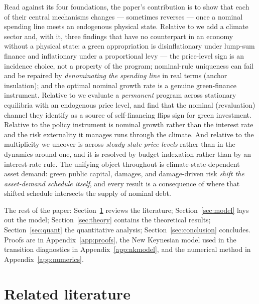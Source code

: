 \documentclass[12pt]{article}
\begin{document}
Read against its four foundations, the paper's
contribution is to show that each of their central mechanisms changes ---
sometimes reverses --- once a nominal spending line meets an endogenous
physical state. Relative to \citet{hagedorn2026dtpl} we add a climate sector
and, with it, three findings that have no counterpart in an economy without a
physical state: a green appropriation is disinflationary under lump-sum
finance and inflationary under a proportional levy --- the price-level sign is
an incidence choice, not a property of the program; nominal-rule uniqueness can
fail and be repaired by \emph{denominating the spending line} in real terms
(anchor insulation); and the optimal nominal growth rate is a genuine
green-finance instrument. Relative to \citet{angeletos2024deficits} we evaluate a
\emph{permanent} program across stationary equilibria with an endogenous
price level, and find that the nominal (revaluation) channel they identify as
a source of self-financing flips sign for green investment. Relative to
\citet{acharya2023optimal} the policy instrument is nominal growth rather than
the interest rate and the risk externality it manages runs through the climate.
And relative to \citet{acharyabenhabib2024} the multiplicity we uncover is
across \emph{steady-state price levels} rather than in the dynamics around one,
and it is resolved by budget indexation rather than by an interest-rate rule.
The unifying object throughout is climate-state-dependent asset demand: green
public capital, damages, and damage-driven risk \emph{shift the asset-demand
schedule itself}, and every result is a consequence of where that shifted
schedule intersects the supply of nominal debt.

The rest of the paper: Section~\ref{sec:literature} reviews the literature;
Section~\ref{sec:model} lays out the model; Section~\ref{sec:theory} contains
the theoretical results; Section~\ref{sec:quant} the quantitative analysis;
Section~\ref{sec:conclusion} concludes. Proofs are in
Appendix~\ref{app:proofs}, the New Keynesian model used in the transition
diagnostics in Appendix~\ref{app:nkmodel}, and the numerical method in
Appendix~\ref{app:numerics}.

\section{Related literature}\label{sec:literature}
\end{document}

